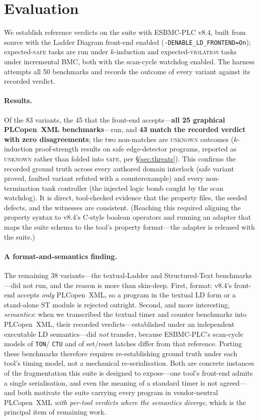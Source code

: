 \section{Evaluation}
\label{sec:eval}

We establish reference verdicts on the suite with ESBMC-PLC v8.4, built from source with the
Ladder Diagram front-end enabled (\texttt{-DENABLE\_LD\_FRONTEND=On}); expected-\textsc{safe}
tasks are run under $k$-induction and expected-\textsc{violation} tasks under incremental BMC,
both with the scan-cycle watchdog enabled. The harness attempts all 50 benchmarks and records
the outcome of every variant against its recorded verdict.

\paragraph{Results.}
Of the 83 variants, the 45 that the front-end accepts---\textbf{all 25 graphical PLCopen~XML
benchmarks}---run, and \textbf{43 match the recorded verdict with zero disagreements}; the two
non-matches are \textsc{unknown} outcomes ($k$-induction proof-strength results on safe
edge-detector programs, reported as \textsc{unknown} rather than folded into \textsc{safe}, per
\S\ref{sec:threats}). This confirms the recorded ground truth across every authored domain
interlock (safe variant proved, faulted variant refuted with a counterexample) and every
non-termination tank controller (the injected logic bomb caught by the scan watchdog). It is
direct, tool-checked evidence that the property files, the seeded defects, and the witnesses are
consistent. (Reaching this required aligning the property syntax to v8.4's C-style boolean
operators and running an adapter that maps the suite schema to the tool's property format---the
adapter is released with the suite.)

\paragraph{A format-and-semantics finding.}
The remaining 38 variants---the textual-Ladder and Structured-Text benchmarks---did not run, and
the reason is more than skin-deep. First, format: v8.4's front-end accepts \emph{only}
PLCopen~XML, so a program in the textual LD form or a stand-alone ST module is rejected outright.
Second, and more interesting, \emph{semantics}: when we transcribed the textual timer and counter
benchmarks into PLCopen~XML, their recorded verdicts---established under an independent executable
LD semantics---did \emph{not} transfer, because ESBMC-PLC's scan-cycle models of \texttt{TON}/
\texttt{CTU} and of set/reset latches differ from that reference. Porting these benchmarks
therefore requires re-establishing ground truth under each tool's timing model, not a mechanical
re-serialisation. Both are concrete instances of the fragmentation this suite is designed to
expose---one tool's front-end admits a single serialisation, and even the meaning of a standard
timer is not agreed---and both motivate the suite carrying every program in vendor-neutral
PLCopen~XML \emph{with per-tool verdicts where the semantics diverge}, which is the principal item
of remaining work.

